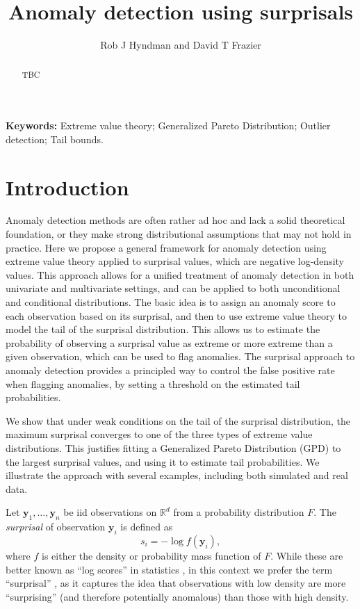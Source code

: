 \documentclass[a4paper,11pt]{article}
\begin{document}
\title{Anomaly detection using surprisals}
\author{Rob J Hyndman and David T Frazier}

\maketitle

\begin{abstract}
	TBC
\end{abstract}

\noindent\textbf{Keywords:}
Extreme value theory;
Generalized Pareto Distribution;
Outlier detection;
Tail bounds.

\section{Introduction}

Anomaly detection methods are often rather ad hoc and lack a solid theoretical foundation, or they make strong distributional assumptions that may not hold in practice. Here we propose a general framework for anomaly detection using extreme value theory applied to surprisal values, which are negative log-density values. This approach allows for a unified treatment of anomaly detection in both univariate and multivariate settings, and can be applied to both unconditional and conditional distributions. The basic idea is to assign an anomaly score to each observation based on its surprisal, and then to use extreme value theory to model the tail of the surprisal distribution. This allows us to estimate the probability of observing a surprisal value as extreme or more extreme than a given observation, which can be used to flag anomalies. The surprisal approach to anomaly detection provides a principled way to control the false positive rate when flagging anomalies, by setting a threshold on the estimated tail probabilities.

We show that under weak conditions on the tail of the surprisal distribution, the maximum surprisal converges to one of the three types of extreme value distributions. This justifies fitting a Generalized Pareto Distribution (GPD) to the largest surprisal values, and using it to estimate tail probabilities. We illustrate the approach with several examples, including both simulated and real data.

Let $\bm{y}_1,\dots,\bm{y}_n$ be iid observations on $\mathbb{R}^d$ from a probability distribution $F$. The \emph{surprisal} of observation $\bm{y}_i$ is defined as \citep{Stone2022}
$$
	s_i=-\log f(\bm{y}_i),
$$
where $f$ is either the density or probability mass function of $F$. While these are better known as ``log scores'' in statistics \citep{Good1952-zw}, in this context we prefer the term ``surprisal'' \citep[coined by][]{Tribus61}, as it captures the idea that observations with low density are more ``surprising'' (and therefore potentially anomalous) than those with high density.
\end{document}
